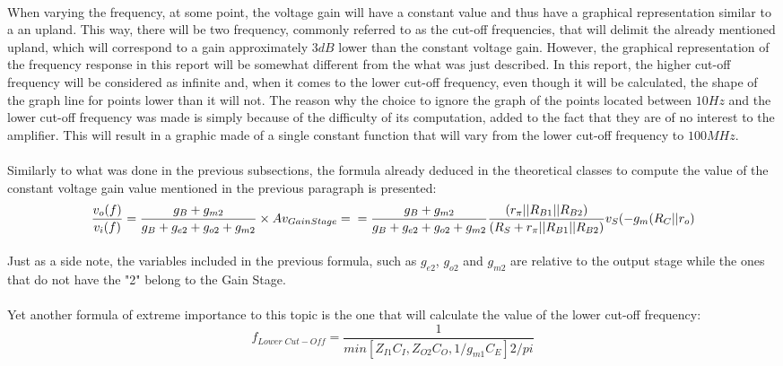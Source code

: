 \paragraph{}When varying the frequency, at some point, the voltage gain will have a constant value and thus have a graphical representation similar to a an upland. This way, there will be two frequency, commonly referred to as the cut-off frequencies, that will delimit the already mentioned upland, which will correspond to a gain approximately $3dB$ lower than the constant voltage gain. However, the graphical representation of the frequency response in this report will be somewhat different from the what was just described. In this report, the higher cut-off frequency will be considered as infinite and, when it comes to the lower cut-off frequency, even though it will be calculated, the shape of the graph line for points lower than it will not. The reason why the choice to ignore the graph of the points located between $10Hz$ and the lower cut-off frequency was made is simply because of the difficulty of its computation, added to the fact that they are of no interest to the amplifier. This will result in a graphic made of a single constant function that will vary from the lower cut-off frequency to $100MHz$.  
\paragraph{}Similarly to what was done in the previous subsections, the formula already deduced in the theoretical classes to compute the value of the constant voltage gain value mentioned in the previous paragraph is presented:
\begin{equation}
    \frac{v_o(f)}{v_i(f)}=\frac{g_B+g_{m2}}{g_B+g_{e2}+g_{o2}+g_{m2}}\times Av_{Gain Stage}= \\ =\frac{g_B+g_{m2}}{g_B+g_{e2}+g_{o2}+g_{m2}}\frac{(r_\pi||R_{B1}||R_{B2})}{(R_S+r_\pi||R_{B1}||R_{B2})}
    v_S(-g_m(R_C||r_o)
\end{equation}
\paragraph{} Just as a side note, the variables included in the previous formula, such as $g_{e2}$, $g_{o2}$ and $g_{m2}$ are relative to the output stage while the ones that do not have the "2" belong to the Gain Stage.
\paragraph{}Yet another formula of extreme importance to this topic is the one that will calculate the value of the lower cut-off frequency:
\begin{equation}
	f_{Lower \; Cut-Off}=\frac{1}{min[Z_{I1}C_I,Z_{O2}C_O,1/g_{m1}C_E] 2 /pi}
\end{equation} 

